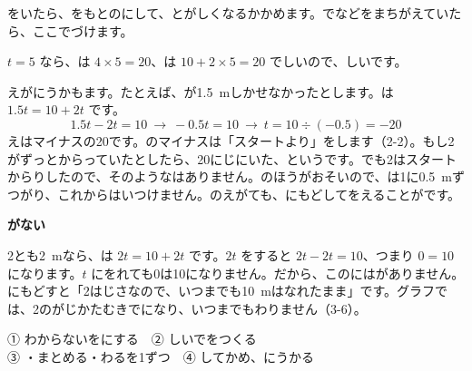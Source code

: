 
\leavevmode\label{bk:2-16:tashikame}をいたら、をもとのにして、とがしくなるかかめます。でなどをまちがえていたら、ここでづけます。

$t=5$ なら、は $4\times5=20$、は $10+2\times5=20$ でしいので、しいです。

えがにうかもます。たとえば、が\qty{1.5}{m}しかせなかったとします。は $1.5t=10+2t$ です。
\[ 1.5t-2t=10\ \to\ -0.5t=10\ \to\ t=10\div(-0.5)=-20 \]
えはマイナスの20です。のマイナスは「スタートより」をします（2-2）。もし2がずっとからっていたとしたら、20にじにいた、というです。でも2はスタートからりしたので、そのようなはありません。のほうがおそいので、は1に\qty{0.5}{m}ずつがり、これからはいつけません。のえがても、にもどしてをえることがです。

\begin{motto}[2]
\textbf{がない}\par
2とも\qty{2}{m}なら、は $2t=10+2t$ です。$2t$ をすると $2t-2t=10$、つまり $0=10$ になります。$t$ にをれても0は10になりません。だから、このにはがありません。にもどすと「2はじさなので、いつまでも\qty{10}{m}はなれたまま」です。グラフでは、2のがじかたむきでになり、いつまでもわりません（3-6）。
\end{motto}

\begin{taisetsu}
① わからないをにする　② しいでをつくる\\
③ ・まとめる・わるを1ずつ　④ してかめ、にうかる
\end{taisetsu}

